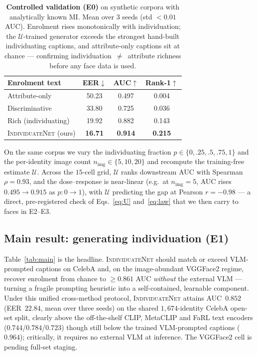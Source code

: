 \documentclass[10pt,twocolumn,letterpaper]{article}
\newcommand{\U}{\mathcal{U}}
\newcommand{\method}{\textsc{IndividuateNet}}
\begin{document}
\begin{table}[t]
  \centering\small
  \setlength{\tabcolsep}{5pt}
  \begin{tabular}{@{}lccc@{}}
    \toprule
    \textbf{Enrolment text} & \textbf{EER}$\downarrow$ & \textbf{AUC}$\uparrow$ & \textbf{Rank-1}$\uparrow$ \\
    \midrule
    Attribute-only          & 50.23 & 0.497 & 0.004 \\
    Discriminative          & 33.80 & 0.725 & 0.036 \\
    Rich (individuating)    & 19.92 & 0.882 & 0.143 \\
    \method{} (ours)        & \textbf{16.71} & \textbf{0.914} & \textbf{0.215} \\
    \bottomrule
  \end{tabular}
  \caption{\textbf{Controlled validation (E0)} on synthetic corpora with analytically known MI.
  Mean over 3 seeds (std $<0.01$ AUC). Enrolment rises monotonically with individuation; the
  $\U$-trained generator exceeds the strongest hand-built individuating captions, and
  attribute-only captions sit at chance --- confirming individuation~$\neq$~attribute richness
  before any face data is used.}
  \label{tab:synth}
\end{table}

On the same corpus we vary the individuating fraction $p\in\{0,.25,.5,.75,1\}$ and the
per-identity image count $n_{\text{img}}\in\{5,10,20\}$ and recompute the training-free estimate
$\U$. Across the $15$-cell grid, $\U$ ranks downstream AUC with Spearman
$\rho=0.93$, and the dose--response is near-linear (e.g.\ at $n_{\text{img}}=5$, AUC rises
$0.495\!\to\!0.915$ as $p:0\!\to\!1$), with $\U$ predicting the gap at Pearson $r=-0.98$ ---
a direct, pre-registered check of Eqs.~\ref{eq:U} and~\ref{eq:law} that we then carry to faces in
E2--E3.

\subsection{Main result: generating individuation (E1)}
\label{sec:e1}
Table~\ref{tab:main} is the headline. \method{} should match or exceed VLM-prompted captions on
CelebA and, on the image-abundant VGGFace2 regime, recover enrolment from chance to
$\ge 0.861$ AUC \emph{without} the external VLM --- turning a fragile prompting heuristic into a
self-contained, learnable component.
Under this unified cross-method protocol, \method{} attains AUC~$0.852$ (EER~$22.84$, mean over
three seeds) on the shared $1{,}674$-identity CelebA open-set split, clearly above the
off-the-shelf CLIP, MetaCLIP and FaRL text encoders ($0.744$/$0.784$/$0.723$) though still below
the trained VLM-prompted captions ($0.964$); critically, it requires no external VLM at
inference. The VGGFace2 cell is pending full-set staging.
\end{document}
